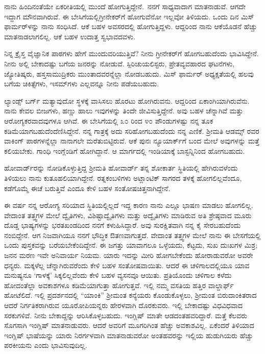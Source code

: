 ನಾನು ಹಿಂದಿನಂತೆಯೇ ಏಕರೀತಿಯಲ್ಲಿ ಮುಂದೆ ಹೋಗುತ್ತಿದ್ದೇನೆ.~ನನಗೆ ಸಾಧ್ಯವಾದಾಗ ಮಾತನಾಡುವೆ. ಆಗದೇ ಇದ್ದಾಗ ಮೌನವಾಗಿರುವೆ. ಈ ಬೇಸಿಗೆಯಲ್ಲಿ\break ಗ್ರೀನೇಕರ್‌ಗೆ ಹೋಗುವೆನೋ ಇಲ್ಲವೋ ತಿಳಿಯದು. ಒಂದು ದಿನ ಮಿಸ್ ಫಾರ್ಮರ್‌ಳನ್ನು ನಾನು ಸಂಧಿಸಿದೆ. ಆಕೆ ಬಹಳ ಅವಸರದಲ್ಲಿ ಹೋಗುತ್ತಿದ್ದಳು. ಆದ್ದರಿಂದ ನಾನು ಆಕೆಯೊಡನೆ ಹೆಚ್ಚು ಮಾತನಾಡಲಾಗಲಿಲ್ಲ. ಆಕೆ ಬಹಳ ಉದಾತ್ತ ಸ್ವಭಾವದವಳು.

ನಿನ್ನ ಕ್ರೈಸ್ತ ವೈಜ್ಞಾನಿಕ ಪಾಠಗಳು ಹೇಗೆ ಮುಂದುವರಿಯುತ್ತಿವೆ? ನೀನು ಗ್ರೀನೇಕರ್‌ಗೆ ಹೋಗಬಹುದೆಂದು ಭಾವಿಸಿದ್ದೇನೆ. ನೀನು ಅಲ್ಲಿ ಬೇಕಾದಷ್ಟು ಬಗೆಯ ಜನರನ್ನು ನೋಡುವೆ. ಸ್ಪಿರಿಚುಯಲಿಸ್ಟರು, ಪ್ರೇತವ್ಯವಹಾರದ ಘಟನೆಗಳು, ಜ್ಯೋತಿಷ್ಕರು, ಹಸ್ತ\break ಸಾಮುದ್ರಿಕರು ಮುಂತಾದವರನ್ನೆಲ್ಲಾ ನೋಡಬಹುದು. ಮಿಸ್‌ ಫಾರ್ಮರ್‌ ಅಧ್ಯಕ್ಷತೆಯಲ್ಲಿ ಹಲವು ಬಗೆಯ ಚಿಕಿತ್ಸೆಗಳು, ಇಸಮ್‌ಗಳು ಎಲ್ಲವನ್ನೂ ನೀನು ಪಡೆಯಬಹುದು.

ಲ್ಯಾಂಡ್ಸ್ ಬರ್ಗ್ ಮತ್ಯಾವುದೋ ಸ್ಥಳಕ್ಕೆ ವಾಸಿಸಲು ಹೊರಟು ಹೋಗಿರುವನು. ಆದ್ದರಿಂದ ಏಕಾಂಗಿಯಾಗಿರುವೆನು. ನಾನು ಕೇವಲ ಬೀಜಗಳು, ಹಣ್ಣು ಹಾಲು ಇವುಗಳನ್ನು ತಿಂದೇ ಜೀವಿಸುತ್ತಿದ್ದೇನೆ. ಅವು ಬಹಳ ಚೆನ್ನಾಗಿವೆ ಮತ್ತು ಆರೋಗ್ಯಕರವಾದವುಗಳೂ ಆಗಿವೆ. ಈ ಬೇಸಿಗೆಯಲ್ಲಿ ೩೦ ರಿಂದ ೪೦ ಪೌಂಡುಗಳಷ್ಟು ನನ್ನ ತೂಕ ಕಡಿಮೆಯಾಗಬಹುದೆಂದೆಣಿಸಿದ್ದೇನೆ. ನನ್ನ ಗಾತ್ರಕ್ಕೆ ಅದು ಸರಿಹೋಗಬಹುದೆಂದು ನನ್ನ ಎಣಿಕೆ. ಶ‍್ರೀಮತಿ ಆಡಮ್ಸ್ ರವರ ವಾಕಿಂಗ್ ಪಾಠಗಳನ್ನೆಲ್ಲಾ ನಾನಾಗಲೇ ಮರೆತುಬಿಟ್ಟಿರುವೆ. ಆಕೆ ಪುನಃ ನ್ಯೂಯಾರ್ಕ್‌ಗೆ ಬಂದ ಮೇಲೆ ಅವುಗಳನ್ನು ಮತ್ತೆ ಕಲಿಯಬೇಕು. ಗಾಂಧಿ ಇಂಗ್ಲೆಂಡಿಗೆ ಹೋಗಿದ್ದಾನೆ. ಆ ಮಾರ್ಗದಲ್ಲಿ ಇಂಡಿಯಾಕ್ಕೆ ಬಾಸ್ಟನ್ನಿನಿಂದ ಹೋಗಬಹುದು.

ಹೋವಾರ್ಡ್‌ರನ್ನು ನೋಡಿಕೊಳ್ಳುತ್ತಿದ್ದ ಶ‍್ರೀಮತಿ ಹೋವಾರ್ಡ್ ತನ್ನ ಶೋಕಾರ್ತ ಸ್ಥಿತಿಯಲ್ಲಿ ಹೇಗಿರುವಳೆಂದು ತಿಳಿಯಲು ನಾನು ಕುತೂಹಲಿಯಾಗಿದ್ದೇನೆ. ರತ್ನಕಂಬಳಿಗಳು ಅಟ್ಲಾಂಟಿಕ್ ಸಾಗರದ ತಳಕ್ಕೆ ಹೋಗಲಿಲ್ಲವೆಂದೂ, ಕಡೆಗೊಮ್ಮೆ ಈಚೆ ಬರುತ್ತಿವೆ ಎಂದೂ ಕೇಳಿ ಬಹಳ ಸಂತೋಷಚಿತ್ತನಾಗಿದ್ದೇನೆ.

ಈ ವರ್ಷ ನನ್ನ ಆರೋಗ್ಯ ಸರಿಯಾದ ಸ್ಥಿತಿಯಲ್ಲಿಲ್ಲದೆ ಇದ್ದ ಕಾರಣ ನಾನು ಎಲ್ಲೂ ಭಾಷಣ ಮಾಡಲು ಹೋಗಲಿಲ್ಲ. ವೇದಾಂತ ತತ್ತ್ವಗಳ ಮೇಲೆ ದ್ವೈತಿಗಳು, ವಿಶಿಷ್ಟಾದ್ವೈತಿಗಳು ಮತ್ತು ಅದ್ವೈತಿಗಳು ಮಾಡಿರುವ ಅತಿ ಶ್ರೇಷ್ಠವಾದ ಮೂರು ದೊಡ್ಡ ಭಾಷ್ಯಗಳನ್ನು ಭರತಖಂಡದಿಂದ ನನಗೆ ಕಳುಹಿಸಿದ್ದಾರೆ. ಅವು ಸುರಕ್ಷಿತವಾಗಿ ನನ್ನ ಕೈ ಸೇರಬಹುದೆಂದು ನಂಬಿದ್ದೇನೆ. ಆಗ ನಿಜವಾಗಿಯೂ ನನಗೆ ಭೌದ್ಧಿಕ ಔತಣವಾಗುತ್ತದೆ. ವೇದಾಂತ ತತ್ತ್ವಗಳ ಮೇಲೆ ನಾನು ಈ ಬೇಸಗೆಯಲ್ಲಿ ಒಂದು ಪುಸ್ತಕವನ್ನು ಬರೆಯಬೇಕೆಂದಿದ್ದೇನೆ. ಈ ಜಗತ್ತು ಯಾವಾಗಲೂ ಒಳ್ಳೆಯದು, ಕೆಟ್ಟದು, ಸುಖ ದುಃಖಗಳ ಮಿಶ್ರ; ಜನನ ಮರಣ ಇವೇ ಅನಿವಾರ್ಯ ನಿಯಮ. ಯಾರು ಇದನ್ನು ಮೀರಿ ಹೋಗಬೇಕೆಂದು ಹೋರಾಡುವರೋ ಅವರೇ ಧನ್ಯರು. ಮಕ್ಕಳೆಲ್ಲ ಚೆನ್ನಾಗಿರುವರೆಂದು ಕೇಳಿ ಬಹಳ ಸಂತೋಷವಾಯಿತು. ಆದರೆ ಈ ಚಳಿಗಾಲದಲ್ಲಿಯೂ ಯಾವ ಮನುಷ್ಯನೂ `ಗಾಳಕ್ಕೆ' ಸಿಕ್ಕಲಿಲ್ಲವೆಂದು ಕೇಳಿ ಬಹಳ ವ್ಯಸನವೂ ಆಯಿತು. ಪ್ರತಿಯೊಂದು ಚಳಿಗಾಲ ಕಳೆದು ಹೋದಂತೆಲ್ಲಾ ಅವಕಾಶಗಳೂ ಕಡಿಮೆಯಾಗುತ್ತಾ ಹೋಗುತ್ತವೆ. ಇಲ್ಲಿ ನಮ್ಮ ವಸತಿಯ ಹತ್ತಿರ ವಾಲ್ದಾರ್ಫ್ ಹೋಟೆಲಿದೆ. ಇಲ್ಲಿ ಪ್ರದರ್ಶನದಲ್ಲಿ “ಯಾಂಕಿ'' ಶ‍್ರೀಮಂತ ಕನ್ಯೆಯರು ಕೊಂಡುಕೊಳ್ಳಲು, ಶ‍್ರೀಮಂತ ಬಿರುದಾಂಕಿತರಾದ ಆದರೆ ನಿರ್ಗತಿಕರಾಗಿರುವ ಯೂರೋಪಿಯನ್ನರು ಹೇರಳವಾಗಿ ದೊರಕುವರು. ಇಲ್ಲಿ ಬೇಕಾದಷ್ಟು ವಿಧವಿಧವಾದ ಸರಕುಗಳಿವೆ. ನೀನು ಬೇಕಾದ್ದನ್ನು ಆರಿಸಿಕೊಳ್ಳಬಹುದು. ಇಂಗ್ಲಿಷ್ ಮಾತೇ ಆಡದಂತಹವರಿದ್ದಾರೆ. ಮತ್ತೆ ಕೆಲವರು ಸೊಗಸಾಗಿ ಇಂಗ್ಲಿಷ್ ಮಾತನಾಡುವರು. ಆದರೆ ಅವರಿಗೆ ಮೂಗರಿಗಿಂತ ಹೆಚ್ಚು ಅವಕಾಶವಿಲ್ಲ. ಏಕೆಂದರೆ ತಿಳಿಯಾದ ಇಂಗ್ಲಿಷ್ ಭಾಷೆಯನ್ನು ಯಾರು ನಿರರ್ಗಳವಾಗಿ ಮಾತನಾಡುವರೋ ಅಂತಹವರನ್ನು ಇಲ್ಲಿಯ ಹುಡುಗಿಯರು ಹೆಚ್ಚು ಪರಕೀಯನು ಎಂದು ಭಾವಿಸುವುದಿಲ್ಲ.

